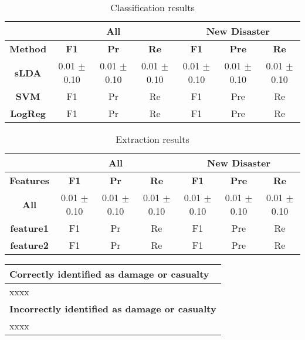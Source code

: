 \documentclass{article}
\begin{document}
\begin{table*}[t]
\centering
\begin{tabular}{|c|c|c|c|c|c|c|}
\hline
              & \multicolumn{3}{c|}{All} &                       \multicolumn{3}{c|}{New Disaster}  \\
\hline
{\bf Method}  &  {\bf F1}        &  {\bf Pr}  &  {\bf Re} & {\bf F1}  &  {\bf Pre}  &  {\bf Re}\\
\hline
{\bf sLDA}    &  0.01 $\pm$ 0.10 & 0.01 $\pm$ 0.10 & 0.01 $\pm$ 0.10 & 0.01 $\pm$ 0.10 & 0.01 $\pm$ 0.10 & 0.01 $\pm$ 0.10\\
{\bf SVM}     &       F1         &       Pr        &       Re        &      F1         &       Pre       &       Re \\
{\bf LogReg}  &       F1         &       Pr        &       Re        &      F1         &       Pre       &       Re \\
\hline
\end{tabular}
\caption{Classification results\label{tab.classification_results}}
\end{table*}



\begin{table*}[t]
\centering
\begin{tabular}{|c|c|c|c|c|c|c|}
\hline
               & \multicolumn{3}{c|}{All} &                       \multicolumn{3}{c|}{New Disaster}  \\
\hline
{\bf Features} &  {\bf F1}        &  {\bf Pr}  &  {\bf Re} & {\bf F1}  &  {\bf Pre}  &  {\bf Re}\\
\hline
{\bf All}      &  0.01 $\pm$ 0.10 & 0.01 $\pm$ 0.10 & 0.01 $\pm$ 0.10 & 0.01 $\pm$ 0.10 & 0.01 $\pm$ 0.10 & 0.01 $\pm$ 0.10\\
{\bf feature1} &       F1         &       Pr        &       Re        &      F1         &       Pre       &       Re \\
{\bf feature2} &       F1         &       Pr        &       Re        &      F1         &       Pre       &       Re \\
\hline
\end{tabular}
\caption{Extraction results\label{tab.extraction_results}}
\end{table*}


\begin{table}[t]
\centering
\begin{tabular}{|l|}
\hline
{\bf Correctly identified as damage or casualty}\\
\hline
xxxx\\
\hline
{\bf Incorrectly identified as damage or casualty}\\
\hline
xxxx\\
\hline
\end{tabular}
\end{table}
\end{document}
